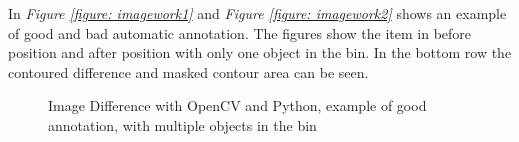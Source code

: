 In \textit{Figure \ref{figure: imagework1}} and \textit{Figure \ref{figure: imagework2}} shows an example of good and bad automatic annotation. The figures show the item in before position and after position with only one object in the bin. In the bottom row the contoured difference and masked contour area can be seen.   
\clearpage
\begin{figure}[ht]
    \centering
    \hspace{0.5cm}
    \hspace{0.5cm}
    \hspace{0.5cm}
    \caption{Image Difference with OpenCV and Python, example of good annotation, with multiple objects in the bin}
    \label{figure: multiimagework1}
\end{figure}

